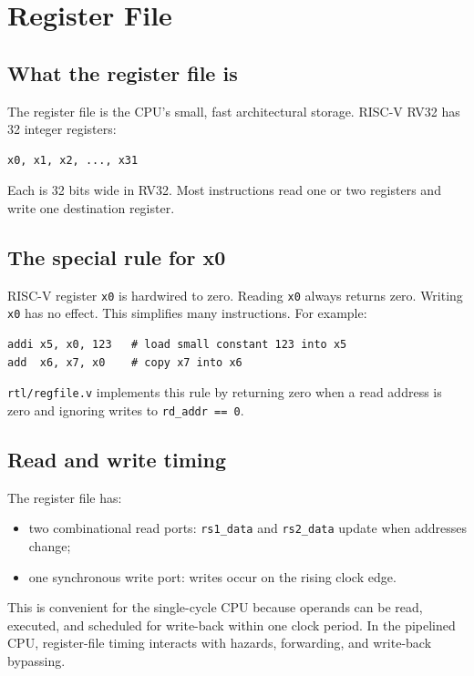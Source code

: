 \section{Register File}

\subsection{What the register file is}

The register file is the CPU’s small, fast architectural storage. RISC-V RV32 has 32 integer registers:

\begin{lstlisting}[language={}]
x0, x1, x2, ..., x31
\end{lstlisting}

Each is 32 bits wide in RV32. Most instructions read one or two registers and write one destination register.

\subsection{The special rule for x0}

RISC-V register \texttt{x0} is hardwired to zero. Reading \texttt{x0} always returns zero. Writing \texttt{x0} has no effect. This simplifies many instructions. For example:

\begin{lstlisting}[language={}]
addi x5, x0, 123   # load small constant 123 into x5
add  x6, x7, x0    # copy x7 into x6
\end{lstlisting}

\texttt{rtl/regfile.v} implements this rule by returning zero when a read address is zero and ignoring writes to \texttt{rd\_addr == 0}.

\subsection{Read and write timing}

The register file has:

\begin{itemize}
\item two combinational read ports: \texttt{rs1\_data} and \texttt{rs2\_data} update when addresses change;
\item one synchronous write port: writes occur on the rising clock edge.
\end{itemize}
This is convenient for the single-cycle CPU because operands can be read, executed, and scheduled for write-back within one clock period. In the pipelined CPU, register-file timing interacts with hazards, forwarding, and write-back bypassing.

\bigskip
